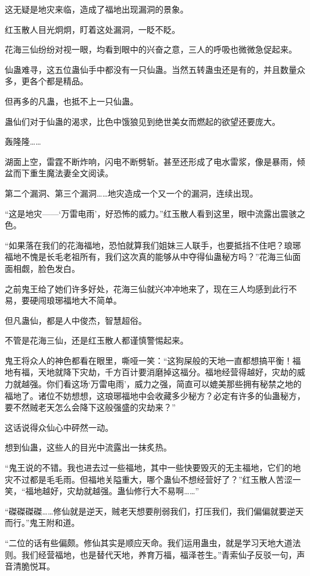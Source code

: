 \begin{this_body}
这无疑是地灾来临，造成了福地出现漏洞的景象。

红玉散人目光炯炯，盯着这处漏洞，一眨不眨。

花海三仙纷纷对视一眼，均看到眼中的兴奋之意，三人的呼吸也微微急促起来。

仙蛊难寻，这五位蛊仙手中都没有一只仙蛊。当然五转蛊虫还是有的，并且数量众多，更各个都是精品。

但再多的凡蛊，也抵不上一只仙蛊。

蛊仙们对于仙蛊的渴求，比色中饿狼见到绝世美女而燃起的欲望还要庞大。

轰隆隆……

湖面上空，雷霆不断炸响，闪电不断劈斩。甚至还形成了电水雷浆，像是暴雨，倾盆而下重生魔法妻全文阅读。

第二个漏洞、第三个漏洞……地灾造成一个又一个的漏洞，连续出现。

“这是地灾——‘万雷电雨’，好恐怖的威力。”红玉散人看到这里，眼中流露出震骇之色。

“如果落在我们的花海福地，恐怕就算我们姐妹三人联手，也要抵挡不住吧？琅琊福地不愧是长毛老祖所有，我们这次真的能够从中夺得仙蛊秘方吗？”花海三仙面面相觑，脸色发白。

之前鬼王给了她们许多好处，花海三仙就兴冲冲地来了，现在三人均感到此行不易，要硬闯琅琊福地大不简单。

但凡蛊仙，都是人中俊杰，智慧超俗。

不管是花海三仙，还是红玉散人都谨慎警惕起来。

鬼王将众人的神色都看在眼里，嘶哑一笑：“这狗屎般的天地一直都想搞平衡！福地有福，天地就降下灾劫，千方百计要消磨掉这福分。福地经营得越好，灾劫的威力就越强。你们看这场‘万雷电雨’，威力之强，简直可以媲美那些拥有秘禁之地的福地了。诸位不妨想想，这琅琊福地中会收藏多少秘方？必定有许多的仙蛊秘方，要不然贼老天怎么会降下这般强盛的灾劫来？”

这话说得众仙心中砰然一动。

想到仙蛊，这些人的目光中流露出一抹炙热。

“鬼王说的不错。我也进去过一些福地，其中一些快要毁灭的无主福地，它们的地灾不过都是毛毛雨。但福地关隘重大，哪个蛊仙不想经营好了？”红玉散人苦涩一笑，“福地越好，灾劫就越强。蛊仙修行大不易啊……”

“磔磔磔磔……修仙就是逆天，贼老天想要削弱我们，打压我们，我们偏偏就要逆天而行。”鬼王附和道。

“二位的话有些偏颇。修仙其实是顺应天命。我们运用蛊虫，就是学习天地大道法则。我们经营福地，也是替代天地，养育万福，福泽苍生。”青索仙子反驳一句，声音清脆悦耳。


\end{this_body}
